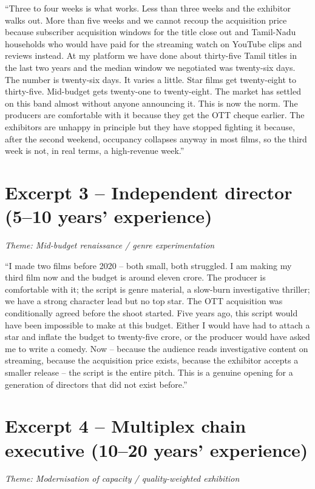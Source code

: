``Three to four weeks is what works.  Less than three weeks and the
exhibitor walks out.  More than five weeks and we cannot recoup the
acquisition price because subscriber acquisition windows for the
title close out and Tamil-Nadu households who would have paid for
the streaming watch on YouTube clips and reviews instead.  At my
platform we have done about thirty-five Tamil titles in the last
two years and the median window we negotiated was twenty-six days.
The number is twenty-six days.  It varies a little.  Star films get
twenty-eight to thirty-five.  Mid-budget gets twenty-one to
twenty-eight.  The market has settled on this band almost without
anyone announcing it.  This is now the norm.  The producers are
comfortable with it because they get the OTT cheque earlier.  The
exhibitors are unhappy in principle but they have stopped fighting
it because, after the second weekend, occupancy collapses anyway in
most films, so the third week is not, in real terms, a high-revenue
week.''

\section*{Excerpt 3 -- Independent director (5--10 years' experience)}
\textit{Theme: Mid-budget renaissance / genre experimentation}
\medskip

``I made two films before 2020 -- both small, both struggled.  I am
making my third film now and the budget is around eleven crore.
The producer is comfortable with it; the script is genre material,
a slow-burn investigative thriller; we have a strong character lead
but no top star.  The OTT acquisition was conditionally agreed
before the shoot started.  Five years ago, this script would have
been impossible to make at this budget.  Either I would have had to
attach a star and inflate the budget to twenty-five crore, or the
producer would have asked me to write a comedy.  Now -- because the
audience reads investigative content on streaming, because the
acquisition price exists, because the exhibitor accepts a smaller
release -- the script is the entire pitch.  This is a genuine
opening for a generation of directors that did not exist before.''

\section*{Excerpt 4 -- Multiplex chain executive (10--20 years' experience)}
\textit{Theme: Modernisation of capacity / quality-weighted exhibition}
\medskip

